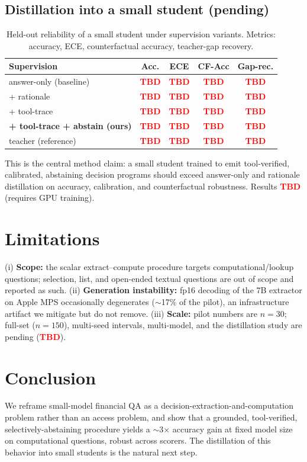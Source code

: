\documentclass[sigconf,nonacm]{acmart}
\newcommand{\tbd}{\textcolor{red}{\textbf{TBD}}}
\begin{document}
\subsection{Distillation into a small student (pending)}
\begin{table}[t]
\caption{Held-out reliability of a small student under supervision variants. Metrics:
accuracy, ECE, counterfactual accuracy, teacher-gap recovery.}
\label{tab:distill}
\begin{tabular}{lcccc}
\toprule
Supervision & Acc. & ECE & CF-Acc & Gap-rec. \\
\midrule
answer-only (baseline) & \tbd & \tbd & \tbd & \tbd \\
+ rationale & \tbd & \tbd & \tbd & \tbd \\
+ tool-trace & \tbd & \tbd & \tbd & \tbd \\
\textbf{+ tool-trace + abstain (ours)} & \tbd & \tbd & \tbd & \tbd \\
teacher (reference) & \tbd & \tbd & \tbd & \tbd \\
\bottomrule
\end{tabular}
\end{table}
This is the central method claim: a small student trained to emit tool-verified, calibrated,
abstaining decision programs should exceed answer-only and rationale distillation on accuracy,
calibration, and counterfactual robustness. Results \tbd{} (requires GPU training).

\section{Limitations}\label{sec:limitations}
(i) \textbf{Scope:} the scalar extract--compute procedure targets computational/lookup questions;
selection, list, and open-ended textual questions are out of scope and reported as such.
(ii) \textbf{Generation instability:} fp16 decoding of the 7B extractor on Apple MPS occasionally
degenerates ($\sim$17\% of the pilot), an infrastructure artifact we mitigate but do not remove.
(iii) \textbf{Scale:} pilot numbers are $n{=}30$; full-set ($n{=}150$), multi-seed intervals,
multi-model, and the distillation study are pending (\tbd).

\section{Conclusion}
We reframe small-model financial QA as a decision-extraction-and-computation problem rather than
an access problem, and show that a grounded, tool-verified, selectively-abstaining procedure
yields a $\sim$3$\times$ accuracy gain at fixed model size on computational questions, robust
across scorers. The distillation of this behavior into small students is the natural next step.
\end{document}

